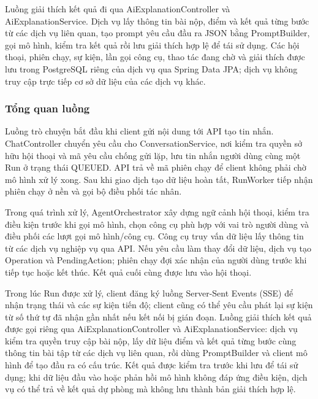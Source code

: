 \documentclass[../BTL.tex]{subfiles}
\begin{document}
Luồng giải thích kết quả đi qua \textnormal{AiExplanationController} và \textnormal{AiExplanationService}. Dịch vụ lấy thông tin bài nộp, điểm và kết quả từng bước từ các dịch vụ liên quan, tạo prompt yêu cầu đầu ra JSON bằng \textnormal{PromptBuilder}, gọi mô hình, kiểm tra kết quả rồi lưu giải thích hợp lệ để tái sử dụng. Các hội thoại, phiên chạy, sự kiện, lần gọi công cụ, thao tác đang chờ và giải thích được lưu trong PostgreSQL riêng của dịch vụ qua Spring Data JPA; dịch vụ không truy cập trực tiếp cơ sở dữ liệu của các dịch vụ khác.

\subsubsection{Tổng quan luồng}

Luồng trò chuyện bắt đầu khi client gửi nội dung tới API tạo tin nhắn. \textnormal{ChatController} chuyển yêu cầu cho \textnormal{ConversationService}, nơi kiểm tra quyền sở hữu hội thoại và mã yêu cầu chống gửi lặp, lưu tin nhắn người dùng cùng một \textnormal{Run} ở trạng thái \textnormal{QUEUED}. API trả về mã phiên chạy để client không phải chờ mô hình xử lý xong. Sau khi giao dịch tạo dữ liệu hoàn tất, \textnormal{RunWorker} tiếp nhận phiên chạy ở nền và gọi bộ điều phối tác nhân.

Trong quá trình xử lý, \textnormal{AgentOrchestrator} xây dựng ngữ cảnh hội thoại, kiểm tra điều kiện trước khi gọi mô hình, chọn công cụ phù hợp với vai trò người dùng và điều phối các lượt gọi mô hình/công cụ. Công cụ truy vấn dữ liệu lấy thông tin từ các dịch vụ nghiệp vụ qua API. Nếu yêu cầu làm thay đổi dữ liệu, dịch vụ tạo \textnormal{Operation} và \textnormal{PendingAction}; phiên chạy đợi xác nhận của người dùng trước khi tiếp tục hoặc kết thúc. Kết quả cuối cùng được lưu vào hội thoại.

Trong lúc Run được xử lý, client đăng ký luồng Server-Sent Events (SSE) để nhận trạng thái và các sự kiện tiến độ; client cũng có thể yêu cầu phát lại sự kiện từ số thứ tự đã nhận gần nhất nếu kết nối bị gián đoạn. Luồng giải thích kết quả được gọi riêng qua \textnormal{AiExplanationController} và \textnormal{AiExplanationService}: dịch vụ kiểm tra quyền truy cập bài nộp, lấy dữ liệu điểm và kết quả từng bước cùng thông tin bài tập từ các dịch vụ liên quan, rồi dùng \textnormal{PromptBuilder} và client mô hình để tạo đầu ra có cấu trúc. Kết quả được kiểm tra trước khi lưu để tái sử dụng; khi dữ liệu đầu vào hoặc phản hồi mô hình không đáp ứng điều kiện, dịch vụ có thể trả về kết quả dự phòng mà không lưu thành bản giải thích hợp lệ.
\end{document}
